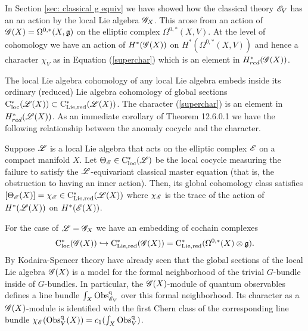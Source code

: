 \documentclass[10pt]{amsart}
\def\brian{\textcolor{blue}{BW: }\textcolor{blue}}
\begin{document}

In Section \ref{sec: classical g equiv} we have showed how the classical theory $\mathscr E_{V}$ has an an action by the local Lie algebra $\mathscr G_X$.
This arose from an action of $\mathscr G(X) = \Omega^{0,*}(X, \mathfrak g)$ on the elliptic complex $\Omega^{0,*}(X, V)$. 
At the level of cohomology we have an action of $H^*(\mathscr G(X))$ on $H^*(\Omega^{0,*}(X, V))$ and hence a character $\chi_{V}$ as in Equation (\ref{superchar}) which is an element in $H^*_{red}(\mathscr G(X))$. 

The local Lie algebra cohomology of any local Lie algebra embeds inside its ordinary (reduced) Lie algebra cohomology of global sections ${\rm C}_{\rm loc}^*(\mathscr L(X)) \subset {\rm C}_{\rm Lie, red}^*(\mathscr L(X))$. 
The character (\ref{superchar}) is an element in $H_{red}^*(\mathscr L(X))$.
As an immediate corollary of \cite{CG2} Theorem 12.6.0.1 we have the following relationship between the anomaly cocycle and the character.

\begin{prop}\label{inner char}
Suppose $\mathscr L$ is a local Lie algebra that acts on the elliptic complex $\mathscr E$ on a compact manifold $X$.
Let $\Theta_\mathscr E \in {\rm C}_{\rm loc}^*(\mathscr L)$ be the local cocycle measuring the failure to satisfy the $\mathscr L$-equivariant classical master equation (that is, the obstruction to having an inner action).
Then, its global cohomology class satisfies $[\Theta_\mathscr E (X)] = \chi_{\mathscr E} \in {\rm C}_{\rm Lie, red}^*(\mathscr L(X))$ where $\chi_\mathscr E$ is the trace of the action of $H^*(\mathscr L(X))$ on $H^*(\mathscr E(X))$. 
\end{prop}


For the case of $\mathscr L = \mathscr G_X$ we have an embedding of cochain complexes
\[
{\rm C}_{\rm loc}^*(\mathscr G(X)) \hookrightarrow {\rm C}_{\rm Lie, red}^*(\mathscr G(X)) = {\rm C}_{\rm Lie, red}^*(\Omega^{0,*}(X) \otimes \mathfrak g) .
\]
By Kodaira-Spencer theory have already seen that the global sections of the local Lie algebra $\mathscr G(X)$ is a model for the formal neighborhood of the trivial $G$-bundle inside of $G$-bundles. 
In particular, the $\mathscr G(X)$-module of quantum observables defines a line bundle $\int_X {\rm Obs}^{\rm q}_{\mathscr E_V}$ over this formal neighborhood.
Its character as a $\mathscr G(X)$-module is identified with the first Chern class of the corresponding line bundle $\chi_\mathscr E({\rm Obs}^{\rm q}_{V}(X)) = c_1(\int_X {\rm Obs}^{\rm q}_{V})$. 
\end{document}
